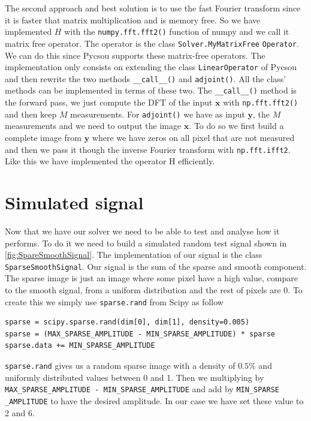 \documentclass[a4paper,11pt,oneside]{report}
\theoremstyle{named}
\begin{document}
The second approach and best solution is to use the fast Fourier transform since it is faster that matrix multiplication and is memory free. So we have implemented $H$ with the \verb+numpy.fft.fft2()+ function of numpy and  we call it matrix free operator. The operator is the class \verb+Solver.MyMatrixFree+  \verb+Operator+. We can do this since Pycsou supports these matrix-free operators. The implementation only consists on extending the class \verb+LinearOperator+ of Pycsou and then rewrite the two methods \verb+__call__()+ and \verb+adjoint()+. All the class' methods can be implemented in terms of these two.  The \verb+__call__()+ method is the forward pass, we just compute the DFT of the input $\boldsymbol{x}$ with \verb+np.fft.fft2()+ and then keep $M$ measurements. For \verb+adjoint()+ we have as input $\boldsymbol{y}$, the $M$ measurements and we need to output the image $\boldsymbol{x}$. To do so we first build a complete image from $\boldsymbol{y}$ where we have zeros on all pixel that are not measured and then we pass it though the inverse Fourier transform with \verb+np.fft.ifft2+. Like this we have implemented the operator H efficiently.

\section{Simulated signal}
Now that we have our solver we need to be able to test and analyse how it performs. To do it we need to build a simulated random test signal shown in \ref{fig:SpareSmoothSignal}. The implementation of our signal is the class \verb+SparseSmoothSignal+. Our signal is the sum of the sparse and smooth component. The sparse image is just an image where some pixel have a high value, compare to the smooth signal, from a uniform distribution and the rest of pixels are 0. To create this we simply use \verb+sparse.rand+ from Scipy as follow
\begin{verbatim}
sparse = scipy.sparse.rand(dim[0], dim[1], density=0.005)
sparse = (MAX_SPARSE_AMPLITUDE - MIN_SPARSE_AMPLITUDE) * sparse
sparse.data += MIN_SPARSE_AMPLITUDE
\end{verbatim}
\verb+sparse.rand+ gives us a random sparse image with a density of $0.5\%$ and uniformly distributed values between 0 and 1. Then we multiplying by \verb+MAX_SPARSE_AMPLITUDE - MIN_SPARSE_AMPLITUDE+ and add by \verb+MIN_SPARSE+ \verb+_AMPLITUDE+ to have the desired amplitude. In our case we have set these value to 2 and 6. 
\end{document}
